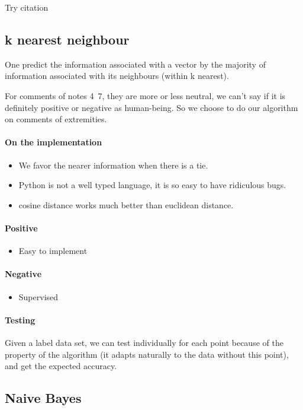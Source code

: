 \documentclass{article}
\begin{document}
Try citation \cite{Zhu_2013}

\subsection{k nearest neighbour}

One predict the information associated with a vector by the majority
of information associated with its neighbours (within k nearest).

For comments of notes 4~7, they are more or less neutral, we can't
say if it is definitely positive or negative as human-being. So we choose
to do our algorithm on comments of extremities.

\paragraph{On the implementation} \begin{itemize}
  \item We favor the nearer information when there is a tie.
  \item Python is not a well typed language, it is so easy to have
  ridiculous bugs.
  \item cosine distance works much better than euclidean distance.
\end{itemize}

\paragraph{Positive} \begin{itemize}
  \item Easy to implement
\end{itemize}

\paragraph{Negative} \begin{itemize}
  \item Supervised
\end{itemize}

\paragraph{Testing} Given a label data set, we can test individually
for each point because of the property of the algorithm (it adapts
naturally to the data without this point), and get the expected
accuracy.

\subsection{Naive Bayes}
\end{document}
